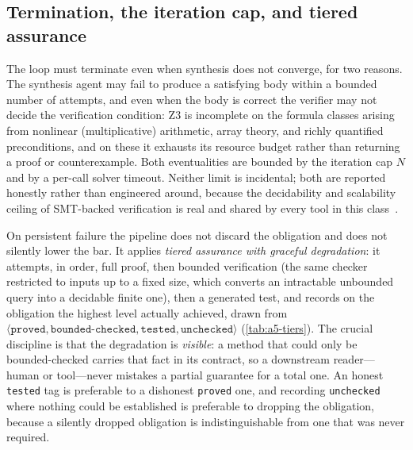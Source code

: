 \subsection{Termination, the iteration cap, and tiered assurance}\label{subsec:a5-tiered}

The loop must terminate even when synthesis does not converge, for two reasons. The synthesis agent may fail to produce a satisfying body within a bounded number of attempts, and even when the body is correct the verifier may not decide the verification condition: Z3 is incomplete on the formula classes arising from nonlinear (multiplicative) arithmetic, array theory, and richly quantified preconditions, and on these it exhausts its resource budget rather than returning a proof or counterexample. Both eventualities are bounded by the iteration cap $N$ and by a per-call solver timeout. Neither limit is incidental; both are reported honestly rather than engineered around, because the decidability and scalability ceiling of SMT-backed verification is real and shared by every tool in this class~\cite{cok2014openjml,demoura2008z3,barbosa2022cvc5}.

On persistent failure the pipeline does not discard the obligation and does not silently lower the bar. It applies \emph{tiered assurance with graceful degradation}: it attempts, in order, full proof, then bounded verification (the same checker restricted to inputs up to a fixed size, which converts an intractable unbounded query into a decidable finite one), then a generated test, and records on the obligation the highest level actually achieved, drawn from $\langle \texttt{proved}, \texttt{bounded-checked}, \texttt{tested}, \texttt{unchecked}\rangle$ (\cref{tab:a5-tiers}). The crucial discipline is that the degradation is \emph{visible}: a method that could only be bounded-checked carries that fact in its contract, so a downstream reader---human or tool---never mistakes a partial guarantee for a total one. An honest \texttt{tested} tag is preferable to a dishonest \texttt{proved} one, and recording \texttt{unchecked} where nothing could be established is preferable to dropping the obligation, because a silently dropped obligation is indistinguishable from one that was never required.

